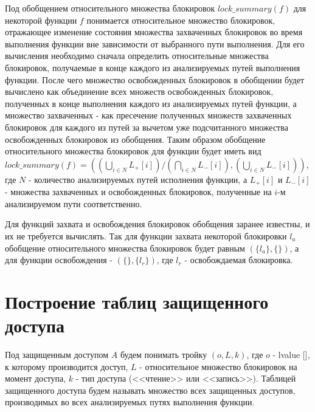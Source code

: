 Под обобщением относительного множества блокировок $lock\_summary(f)$ для некоторой функции $f$ понимается относительное множество блокировок, отражающее изменение состояния множества захваченных блокировок во время выполнения функции вне зависимости от выбранного пути выполнения. Для его вычисления необходимо сначала определить относительные множества блокировок, получаемые в конце каждого из анализируемых путей выполнения функции. После чего множество освобожденных блокировок в обобщении будет вычислено как объединение всех множеств освобожденных блокировок, полученных в конце выполнения каждого из анализируемых путей функции, а множество захваченных - как пресечение полученных множеств захваченных блокировок для каждого из путей за вычетом уже подсчитанного множества освобожденных блокировок из обобщения. Таким образом обобщение относительного множества блокировок для функции будет иметь вид $lock\_summary(f) = ((\bigcup_{i \in N}L_{+}[i])/(\bigcap_{i \in N}L_{-}[i]), (\bigcup_{i \in N}L_{-}[i]))$, где $N$ - количество анализируемых путей исполнения функции, а $L_{+}[i]$ и $L_{-}[i]$ - множества захваченных и освобожденных блокировок, полученные на $i$-м анализируемом пути соответственно.

Для функций захвата и освобождения блокировок обобщения заранее известны, и их не требуется вычислять. Так для функции захвата некоторой блокировки $l_{a}$ обобщение относительного множества блокировок будет равным $(\{l_{a}\}, \{\})$, а для функции освобождения - $(\{\}, \{l_{r}\})$, где $l_{r}$ - освобождаемая блокировка.

\section{Построение таблиц защищенного доступа}
\label{sec:build-tables}

Под защищенным доступом $A$ будем понимать тройку $(o, L, k)$, где $o$ - lvalue [], к которому производится доступ, $L$ - относительное множество блокировок на момент доступа, $k$ - тип доступа (<<чтение>> или <<запись>>). Таблицей защищенного доступа будем называть множество всех защищенных доступов, производимых во всех анализируемых путях выполнения функции.

